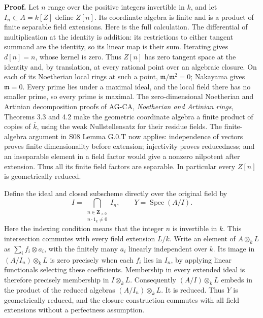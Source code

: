 \documentclass[11pt,a4paper,openany]{report}
\begin{document}
\textbf{Proof.} Let \(n\) range over the positive integers invertible in \(k\), and let \(I_n\subset A=k[Z]\) define \(Z[n]\). Its coordinate algebra is finite and is a product of finite separable field extensions. Here is the full calculation. The differential of multiplication at the identity is addition: its restrictions to either tangent summand are the identity, so its linear map is their sum. Iterating gives \(d[n]=n\), whose kernel is zero. Thus \(Z[n]\) has zero tangent space at the identity and, by translation, at every rational point over an algebraic closure. On each of its Noetherian local rings at such a point, \(\mathfrak m/\mathfrak m^2=0\); Nakayama gives \(\mathfrak m=0\). Every prime lies under a maximal ideal, and the local field there has no smaller prime, so every prime is maximal. The zero-dimensional Noetherian and Artinian decomposition proofs of AG-CA, \emph{Noetherian and Artinian rings}, Theorems 3.3 and 4.2 make the geometric coordinate algebra a finite product of copies of \(\bar k\), using the weak Nullstellensatz for their residue fields. The finite-algebra argument in S08 Lemma G.0.T now applies: independence of vectors proves finite dimensionality before extension; injectivity proves reducedness; and an inseparable element in a field factor would give a nonzero nilpotent after extension. Thus all its finite field factors are separable. In particular every \(Z[n]\) is geometrically reduced.

Define the ideal and closed subscheme directly over the original field by \[
 I=\bigcap_{\substack{n\in\mathbf Z_{>0}\\ n\cdot1_k\ne0}} I_n,
 \qquad Y=\operatorname{Spec}(A/I).
\] Here the indexing condition means that the integer \(n\) is invertible in \(k\). This intersection commutes with every field extension \(L/k\). Write an element of \(A\otimes_kL\) as \(\sum_i f_i\otimes a_i\), with the finitely many \(a_i\) linearly independent over \(k\). Its image in \((A/I_n)\otimes_k L\) is zero precisely when each \(f_i\) lies in \(I_n\), by applying linear functionals selecting these coefficients. Membership in every extended ideal is therefore precisely membership in \(I\otimes_kL\). Consequently \((A/I)\otimes_kL\) embeds in the product of the reduced algebras \((A/I_n)\otimes_kL\). It is reduced. Thus \(Y\) is geometrically reduced, and the closure construction commutes with all field extensions without a perfectness assumption.
\end{document}
